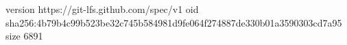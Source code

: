 version https://git-lfs.github.com/spec/v1
oid sha256:4b79b4c99b523be32c745b584981d9fe064f274887de330b01a3590303cd7a95
size 6891

